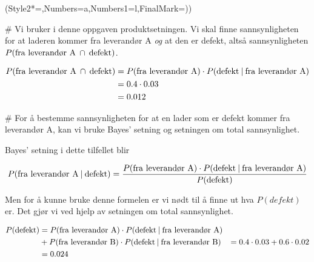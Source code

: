\begin{easylist}[enumerate]
	\ListProperties(Style2*=,Numbers=a,Numbers1=l,FinalMark={)})
	
	
	# Vi bruker i denne oppgaven produktsetningen. Vi skal finne sannsynligheten for at laderen kommer fra leverandør A \textit{og} at den er defekt, altså sannsynligheten $P(\textnormal{fra leverandør A} \: \cap \: \textnormal{defekt})$.
	
	\begin{equation*}
		\begin{aligned}
			P(\textnormal{fra leverandør A} \: \cap \: \textnormal{defekt}) & = P(\textnormal{fra leverandør A}) \cdot P(\textnormal{defekt}  \: | \: \textnormal{fra leverandør A}) \\
			& = 0.4 \cdot 0.03 \\
			& = 0.012
		\end{aligned}
	\end{equation*}
	
	
	# For å bestemme sannsynligheten for at en lader som er defekt kommer fra leverandør A, kan vi bruke Bayes' setning og setningen om total sannsynlighet. 
	
	Bayes' setning i dette tilfellet blir 
	
	\begin{equation*}
		\begin{aligned}
			P(\textnormal{fra leverandør A} \: | \:  \textnormal{defekt}) &= \frac{P(\textnormal{fra leverandør A}) \cdot P(\textnormal{defekt} \: | \: \textnormal{fra leverandør A})}{P(\textnormal{defekt})} \\
		\end{aligned}
	\end{equation*}

	Men for å kunne bruke denne formelen er vi nødt til å finne ut hva $P(defekt)$ er. Det gjør vi ved hjelp av setningen om total sannsynlighet.
	
	\begin{equation*}
		\begin{aligned}
			P(\textnormal{defekt}) & = P(\textnormal{fra leverandør A}) \cdot P(\textnormal{defekt} \: | \: \textnormal{fra leverandør A}) \\
			& + P(\textnormal{fra leverandør B}) \cdot P(\textnormal{defekt} \: | \: \textnormal{fra leverandør B})
			& = 0.4 \cdot 0.03 + 0.6 \cdot 0.02 \\
			& = 0.024
		\end{aligned}
	\end{equation*}
	

\end{easylist}

